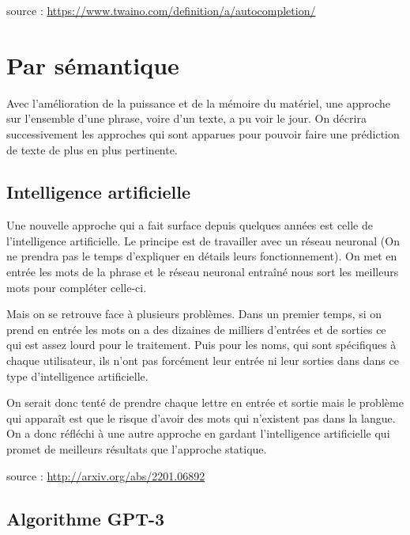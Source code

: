\documentclass[final, 10pt]{report}
\begin{document}
    \footnotesize
    source : \url{https://www.twaino.com/definition/a/autocompletion/}
    \normalsize
    
\section{Par sémantique}

    Avec l'amélioration de la puissance et de la mémoire du matériel, une approche sur l'ensemble d'une phrase, voire d'un texte, a pu voir le jour.
    On décrira successivement les approches qui sont apparues pour pouvoir faire une prédiction de texte de plus en plus pertinente.
    
    \subsection{Intelligence artificielle}
    
        Une nouvelle approche qui a fait surface depuis quelques années est celle de l'intelligence artificielle.
        Le principe est de travailler avec un réseau neuronal (On ne prendra pas le temps d'expliquer en détails leurs fonctionnement).
        On met en entrée les mots de la phrase et le réseau neuronal entraîné nous sort les meilleurs mots pour compléter celle-ci. %
        
        Mais on se retrouve face à plusieurs problèmes. 
        Dans un premier temps, si on prend en entrée les mots on a des dizaines de milliers d'entrées et de sorties ce qui est assez lourd pour le traitement.
        Puis pour les noms, qui sont spécifiques à chaque utilisateur, ils n'ont pas forcément leur entrée ni leur sorties dans dans ce type d'intelligence artificielle.
        
        On serait donc tenté de prendre chaque lettre en entrée et sortie mais le problème qui apparaît est que le risque d'avoir des mots qui n'existent pas dans la langue.
        On a donc réfléchi à une autre approche en gardant l'intelligence artificielle qui promet de meilleurs résultats que l'approche statique.
        
        \footnotesize
        source : \url{http://arxiv.org/abs/2201.06892}
        \normalsize
    
    \subsection{Algorithme GPT-3}
\end{document}
